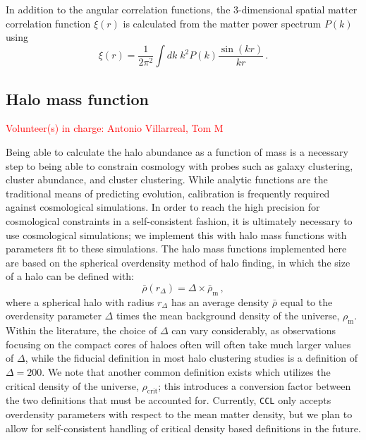 \documentclass[\docopts]{\docclass}
\newcommand{\vol}[1]{\textcolor{red}{Volunteer(s) in charge: #1}}
\newcommand{\ccl}{{\tt CCL}\xspace}
\begin{document}
In addition to the angular correlation functions, the 3-dimensional spatial matter correlation function $\xi(r)$ is calculated from the matter power spectrum $P(k)$ using
\begin{equation}
\xi(r) = \frac{1}{2 \pi^2} \int dk \; k^2 P(k) \frac{\sin(kr)}{kr}\,.
\end{equation}


\subsection{Halo mass function}
\label{sec:halo_mass_function}
\vol{Antonio Villarreal, Tom M}

Being able to calculate the halo abundance as a function of mass is a necessary step to being able to constrain cosmology with probes such as galaxy clustering, cluster abundance, and cluster clustering. While analytic functions are the traditional means of predicting evolution, calibration is frequently required against cosmological simulations. In order to reach the high precision for cosmological constraints in a self-consistent fashion, it is ultimately necessary to use cosmological simulations; we implement this with halo mass functions with parameters fit to these simulations. The halo mass functions implemented here are based on the spherical overdensity method of halo finding, in which the size of a halo can be defined with:
%
\begin{equation}
  \bar{\rho}(r_{\Delta}) = \Delta \times \bar{\rho}_{\mathrm{m}}\, ,
\end{equation}
%
where a spherical halo with radius $r_{\Delta}$ has an average density $\bar{\rho}$ equal to the overdensity parameter $\Delta$ times the mean background density of the universe, $\rho_{\mathrm{m}}$. Within the literature, the choice of $\Delta$ can vary considerably, as observations focusing on the compact cores of haloes often will often take much larger values of $\Delta$, while the fiducial definition in most halo clustering studies is a definition of $\Delta = 200$. We note that another common definition exists which utilizes the critical density of the universe, $\rho_{\mathrm{crit}}$; this introduces a conversion factor between the two definitions that must be accounted for. Currently, \ccl only accepts overdensity parameters with respect to the mean matter density, but we plan to allow for self-consistent handling of critical density based definitions in the future.
\end{document}
